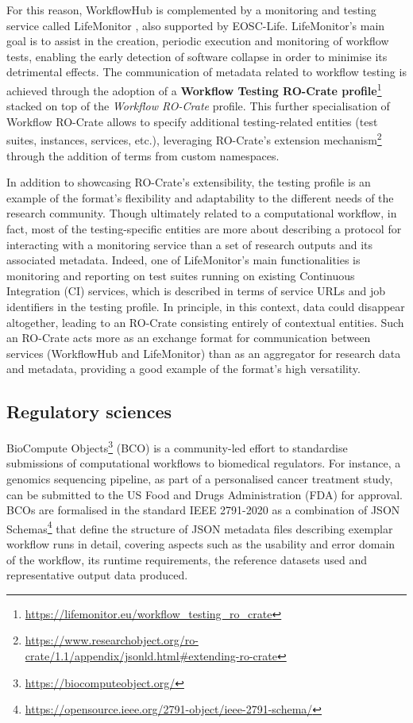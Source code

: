 \documentclass[ds,v1.1.2,openaccess]{iosart2x}%
\begin{document}
For this reason, WorkflowHub is complemented by a monitoring and
testing service called LifeMonitor \cite{about-lifemonitor}, also supported
by EOSC-Life. LifeMonitor's main goal is to assist in the creation,
periodic execution and monitoring of workflow tests, enabling the early
detection of software collapse in order to minimise its detrimental
effects. The communication of metadata related to workflow testing is
achieved through the adoption of a \textbf{Workflow Testing RO-Crate
profile}\footnote{\url{https://lifemonitor.eu/workflow_testing_ro_crate}} stacked on
top of the \textit{Workflow RO-Crate} profile. This further specialisation of
Workflow RO-Crate allows to specify additional testing-related entities
(test suites, instances, services, etc.), leveraging RO-Crate's
extension
mechanism\footnote{\url{https://www.researchobject.org/ro-crate/1.1/appendix/jsonld.html\#extending-ro-crate}}
through the addition of terms from custom namespaces.

In addition to showcasing RO-Crate's extensibility, the testing profile
is an example of the format's flexibility and adaptability to the
different needs of the research community. Though ultimately related to
a computational workflow, in fact, most of the testing-specific
entities are more about describing a protocol for interacting with a
monitoring service than a set of research outputs and its associated
metadata. Indeed, one of LifeMonitor's main functionalities is
monitoring and reporting on test suites running on existing Continuous
Integration (CI) services, which is described in terms of service URLs
and job identifiers in the testing profile. In principle, in this
context, data could disappear altogether, leading to an RO-Crate
consisting entirely of contextual entities. Such an RO-Crate acts more
as an exchange format for communication between services (WorkflowHub
and LifeMonitor) than as an aggregator for research data and metadata,
providing a good example of the format's high versatility.


\subsection{Regulatory sciences}%

\label{sec:regulatorysciences}

BioCompute Objects\footnote{\url{https://biocomputeobject.org/}} (BCO)
\cite{doi:10.1371/journal.pbio.3000099} is a community-led effort to
standardise submissions of computational workflows to biomedical
regulators. For instance, a genomics sequencing pipeline, as part of a
personalised cancer treatment study, can be submitted to the US Food
and Drugs Administration (FDA) for approval. BCOs are formalised in the
standard IEEE 2791-2020 \cite{doi:10.1109/IEEESTD.2020.9094416} as a
combination of JSON
Schemas\footnote{\url{https://opensource.ieee.org/2791-object/ieee-2791-schema/}}
that define the structure of JSON metadata files describing exemplar
workflow runs in detail, covering aspects such as the usability and
error domain of the workflow, its runtime requirements, the reference
datasets used and representative output data produced.
\end{document}

